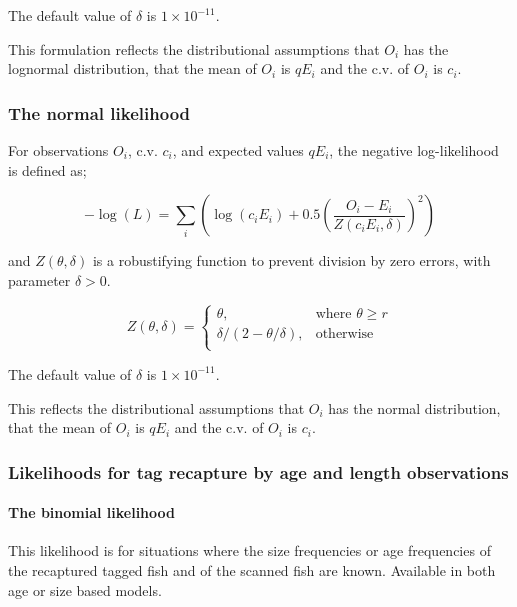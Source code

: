 The default value of $\delta$ is $1 \times 10^{-11}$.

This formulation reflects the distributional assumptions that  $O_i$ has the lognormal distribution, that the mean of $O_i$ is $qE_i$  and the c.v. of $O_i$ is $c_i$.

\subsubsection*{The normal likelihood}

For observations $O_i$, c.v. $c_i$, and expected values $qE_i$, the negative log-likelihood is defined as;

\begin{equation}
- \log \left(L \right) = \sum\limits_i \left( \log \left( c_i E_i \right) +0.5 \left( \frac{O_i-E_i}{Z\left(c_i E_i,\delta \right)}\right)^2\right)
\end{equation}

and $Z \left(\theta,\delta \right)$ is a robustifying function to prevent division by zero errors, with parameter $\delta>0$.

\begin{equation}
Z \left(\theta,\delta \right) = \begin{cases}
\theta, & \text{where $\theta \ge r$} \\
\delta/\left( 2-\theta/\delta \right), & \text{otherwise} \\
\end{cases}
\end{equation}

The default value of $\delta$ is $1 \times 10^{-11}$.

This reflects the distributional assumptions that  $O_i$ has the normal distribution, that the mean of $O_i$ is $qE_i$  and the c.v. of $O_i$ is $c_i$.

\subsubsection{Likelihoods for tag recapture by age and length observations}
\paragraph*{The binomial likelihood}

This likelihood is for situations where the size frequencies or age frequencies of the recaptured tagged fish and of the scanned fish are known. Available in both age or size based models.


